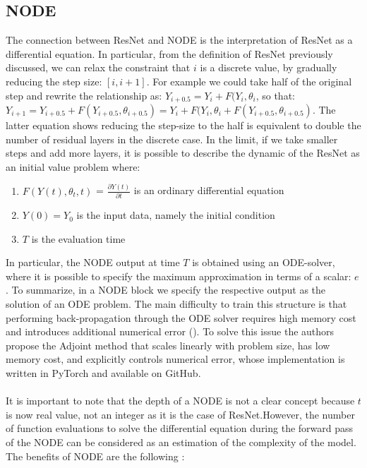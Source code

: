 \documentclass[LaM,binding=0.6cm]{sapthesis}
\begin{document}
\subsection{NODE}
The connection between ResNet and NODE is the interpretation of ResNet as a differential equation. In particular, from the definition of ResNet previously discussed, we can relax the constraint that $i$ is a discrete value, by gradually reducing the step size: $[i,i+1]$. For example we could take half of the original step and rewrite the relationship as: $Y_{i+0.5} = Y_{i} +F(Y_{i},\theta_{i}$, so that: $Y_{i+1} = Y_{i+0.5} +F(Y_{i+0.5},\theta_{i+0.5}) = Y_{i} + F(Y_{i},\theta_{i} + F(Y_{i+0.5},\theta_{i+0.5})$. The latter equation shows reducing the step-size to the half is equivalent to double the number of residual layers in the discrete case. In the limit, if we take smaller steps and add more layers, it is possible to describe the dynamic of the ResNet as an initial value problem where: 
\begin{enumerate}
\item $F(Y(t),\theta_{t},t)$ = $\frac{\partial Y(t)}{ \partial t}$ is an ordinary differential equation
\item $Y(0)=Y_0$ is the input data, namely the initial condition
\item $T$ is the evaluation time 
\end{enumerate}
In particular, the NODE output at time $T$ is obtained using an ODE-solver, where it is possible to specify the maximum approximation in terms of a scalar: $e$. To summarize, in a NODE block we specify the respective output as the solution of an ODE problem. The main difficulty to train this structure is that performing back-propagation through the ODE solver requires high memory cost and introduces additional numerical error (\cite{DBLP:journals/corr/abs-1806-07366}). To solve this issue the authors propose the Adjoint method that scales linearly with problem size, has low memory cost, and explicitly controls numerical error, whose implementation is written in PyTorch and available on GitHub.\\\\It is important to note that the depth of a NODE is not a clear concept because $t$ is now real value, not an integer as it is the case of ResNet.However, the number of function evaluations to solve the differential equation during the forward pass of the NODE can be considered as an estimation of the complexity of the model. The benefits of NODE are the following :
\end{document}
